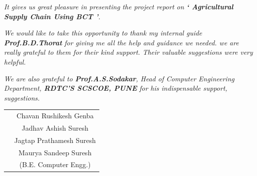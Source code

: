 \documentclass[oneside,a4paper,12pt]{report}
\begin{document}
\thispagestyle{plain}
\setcounter{page}{0}
\frontmatter
{}
\rfoot{\thepage}



{   }

\textit{It gives us great pleasure in presenting the project report on {\bfseries \fontsize{12}{12} \selectfont ` Agricultural Supply Chain Using BCT '}.}
\vspace*{1.5\baselineskip}

 \textit{We would like to take this opportunity to thank my internal guide \textbf{Prof.B.D.Thorat} for giving me all the help and guidance we needed. we are really grateful to them for their kind support. Their valuable suggestions were very helpful.} \vspace*{1.5\baselineskip}

 \textit{We are also grateful to \textbf{Prof.A.S.Sodakar}, Head of Computer Engineering Department, \textbf{RDTC'S SCSCOE, PUNE} for his indispensable support, suggestions.}
 \vspace*{3\baselineskip} \\
\begin{tabular}{p{8.2cm}c}
& Chavan Rushikesh Genba \\
& Jadhav Ashish Suresh \\
& Jagtap Prathamesh Suresh \\
& Maurya Sandeep Suresh \\
&(B.E. Computer Engg.)
\end{tabular}
{}



{  }
\end{document}
